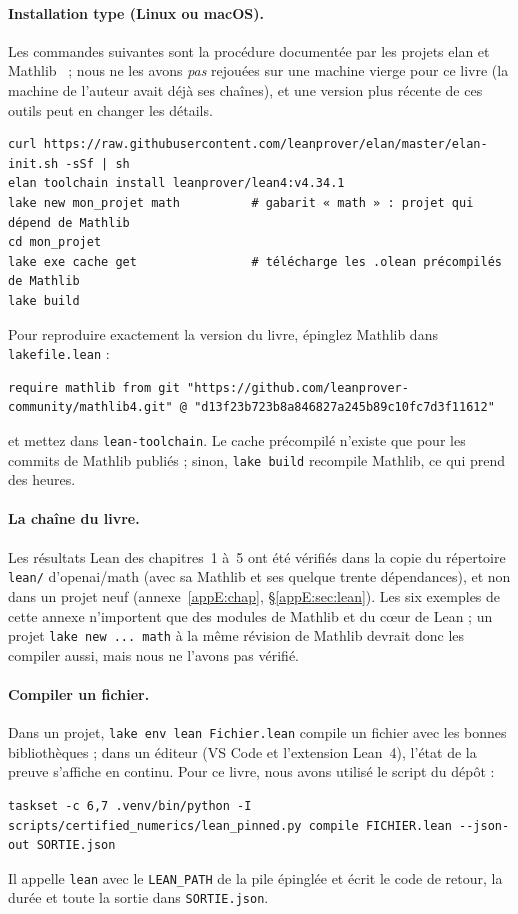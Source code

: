 \paragraph{Installation type (Linux ou macOS).} Les commandes suivantes sont la procédure documentée par les projets
elan et Mathlib~\cite{app:elan,app:mathlibinstall} ; nous ne les avons \emph{pas} rejouées sur une machine vierge pour
ce livre (la machine de l'auteur avait déjà ses chaînes), et une version plus récente de ces outils peut en changer
les détails.
\begin{lstlisting}[style=appC,language={}]
curl https://raw.githubusercontent.com/leanprover/elan/master/elan-init.sh -sSf | sh
elan toolchain install leanprover/lean4:v4.34.1
lake new mon_projet math          # gabarit « math » : projet qui dépend de Mathlib
cd mon_projet
lake exe cache get                # télécharge les .olean précompilés de Mathlib
lake build
\end{lstlisting}
Pour reproduire exactement la version du livre, épinglez Mathlib dans \texttt{lakefile.lean} :
\begin{lstlisting}[style=appC,language={}]
require mathlib from git "https://github.com/leanprover-community/mathlib4.git" @ "d13f23b723b8a846827a245b89c10fc7d3f11612"
\end{lstlisting}
et mettez  dans \texttt{lean-toolchain}. Le cache précompilé n'existe que pour les
commits de Mathlib publiés ; sinon, \texttt{lake build} recompile Mathlib, ce qui prend des heures.

\paragraph{La chaîne du livre.} Les résultats Lean des chapitres~1 à~5 ont été vérifiés dans la copie du répertoire
\texttt{lean/} d'openai/math (avec sa Mathlib et ses quelque trente dépendances), et non dans un projet neuf
(annexe~\ref{appE:chap}, §\ref{appE:sec:lean}). Les six exemples de cette annexe n'importent que des modules de Mathlib
et du cœur de Lean ; un projet \texttt{lake new ... math} à la même révision de Mathlib devrait donc les compiler aussi,
mais nous ne l'avons pas vérifié.

\paragraph{Compiler un fichier.} Dans un projet, \texttt{lake env lean Fichier.lean} compile un fichier avec les
bonnes bibliothèques ; dans un éditeur (VS Code et l'extension Lean~4), l'état de la preuve s'affiche en continu.
Pour ce livre, nous avons utilisé le script du dépôt :
\begin{lstlisting}[style=appC,language={}]
taskset -c 6,7 .venv/bin/python -I scripts/certified_numerics/lean_pinned.py compile FICHIER.lean --json-out SORTIE.json
\end{lstlisting}
Il appelle \texttt{lean}  avec le \texttt{LEAN\_PATH} de la pile épinglée et écrit le code de
retour, la durée et toute la sortie dans \texttt{SORTIE.json}.


